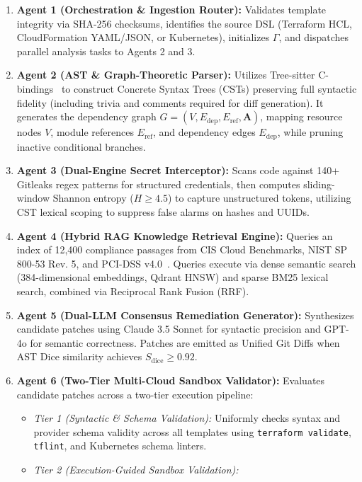 \documentclass[runningheads]{llncs}
\begin{document}
\begin{enumerate}
    \item \textbf{Agent 1 (Orchestration \& Ingestion Router):} Validates template integrity via SHA-256 checksums, identifies the source DSL (Terraform HCL, CloudFormation YAML/JSON, or Kubernetes), initializes $\Gamma$, and dispatches parallel analysis tasks to Agents 2 and 3.
    \item \textbf{Agent 2 (AST \& Graph-Theoretic Parser):} Utilizes Tree-sitter C-bindings~\cite{treesitter2024} to construct Concrete Syntax Trees (CSTs) preserving full syntactic fidelity (including trivia and comments required for diff generation). It generates the dependency graph $G = (V, E_{\mathrm{dep}}, E_{\mathrm{ref}}, \mathbf{A})$, mapping resource nodes $V$, module references $E_{\mathrm{ref}}$, and dependency edges $E_{\mathrm{dep}}$, while pruning inactive conditional branches.
    \item \textbf{Agent 3 (Dual-Engine Secret Interceptor):} Scans code against 140+ Gitleaks regex patterns for structured credentials, then computes sliding-window Shannon entropy ($H \ge 4.5$) to capture unstructured tokens, utilizing CST lexical scoping to suppress false alarms on hashes and UUIDs.
    \item \textbf{Agent 4 (Hybrid RAG Knowledge Retrieval Engine):} Queries an index of 12,400 compliance passages from CIS Cloud Benchmarks, NIST SP 800-53 Rev. 5, and PCI-DSS v4.0~\cite{cisaws2023}. Queries execute via dense semantic search (384-dimensional embeddings, Qdrant HNSW) and sparse BM25 lexical search, combined via Reciprocal Rank Fusion (RRF).
    \item \textbf{Agent 5 (Dual-LLM Consensus Remediation Generator):} Synthesizes candidate patches using Claude 3.5 Sonnet for syntactic precision and GPT-4o for semantic correctness. Patches are emitted as Unified Git Diffs when AST Dice similarity achieves $S_{\mathrm{dice}} \ge 0.92$.
    \item \textbf{Agent 6 (Two-Tier Multi-Cloud Sandbox Validator):} Evaluates candidate patches across a two-tier execution pipeline:
    \begin{itemize}
        \item \textit{Tier 1 (Syntactic \& Schema Validation):} Uniformly checks syntax and provider schema validity across all templates using \texttt{terraform validate}, \texttt{tflint}, and Kubernetes schema linters.
        \item \textit{Tier 2 (Execution-Guided Sandbox Validation):}
        \begin{itemize}

\end{itemize}
\end{itemize}
\end{enumerate}
\end{document}
